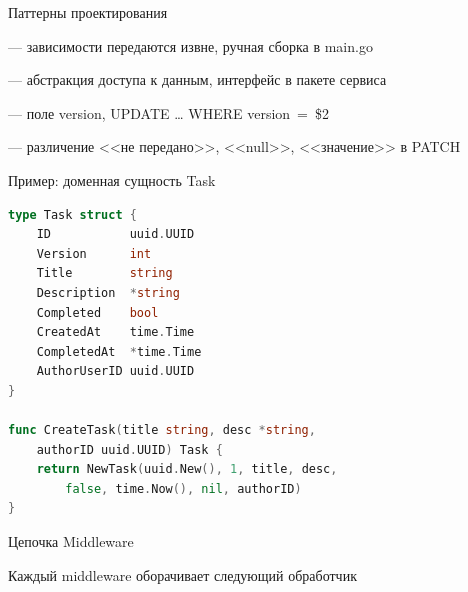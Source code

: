 \documentclass[aspectratio=169, 14pt]{beamer}
\begin{document}
\begin{frame}{Паттерны проектирования}

\begin{description}[leftmargin=0.5cm]
  \item[Dependency Injection] --- зависимости передаются извне, ручная сборка в main.go
  \item[Repository Pattern] --- абстракция доступа к данным, интерфейс в пакете сервиса
  \item[Optimistic Locking] --- поле version, UPDATE \ldots{} WHERE version~=~\$2
  \item[Nullable{[T]}] --- различение <<не передано>>, <<null>>, <<значение>> в PATCH
\end{description}

\end{frame}

\begin{frame}[fragile]{Пример: доменная сущность Task}

\begin{lstlisting}[language=Go]
type Task struct {
    ID           uuid.UUID
    Version      int
    Title        string
    Description  *string
    Completed    bool
    CreatedAt    time.Time
    CompletedAt  *time.Time
    AuthorUserID uuid.UUID
}

func CreateTask(title string, desc *string,
    authorID uuid.UUID) Task {
    return NewTask(uuid.New(), 1, title, desc,
        false, time.Now(), nil, authorID)
}
\end{lstlisting}

\end{frame}

\begin{frame}{Цепочка Middleware}

\centering
{}

\vspace{0.3cm}
Каждый middleware оборачивает следующий обработчик

\end{frame}
\end{document}
